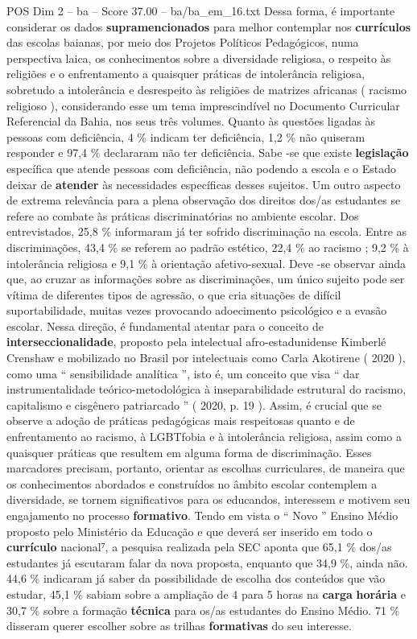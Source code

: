 \begin{textsample}{POS Dim 2 – ba – Score 37.00 – ba/ba\_em\_16.txt}
Dessa forma, é importante considerar os dados \textbf{supramencionados} para melhor contemplar nos \textbf{currículos} das escolas baianas, por meio dos Projetos Políticos Pedagógicos, numa perspectiva laica, os conhecimentos sobre a diversidade religiosa, o respeito às religiões e o enfrentamento a quaisquer práticas de intolerância religiosa, sobretudo a intolerância e desrespeito às religiões de matrizes africanas ( racismo religioso ), considerando esse um tema imprescindível no Documento Curricular Referencial da Bahia, nos seus três volumes.
Quanto às questões ligadas às pessoas com deficiência, 4 \% indicam ter deficiência, 1,2 \% não quiseram responder e 97,4 \% declararam não ter deficiência.
Sabe -se que existe \textbf{legislação} específica que atende pessoas com deficiência, não podendo a escola e o Estado deixar de \textbf{atender} às necessidades específicas desses sujeitos.
Um outro aspecto de extrema relevância para a plena observação dos direitos dos/as estudantes se refere ao combate às práticas discriminatórias no ambiente escolar.
Dos entrevistados, 25,8 \% informaram já ter sofrido discriminação na escola.
Entre as discriminações, 43,4 \% se referem ao padrão estético, 22,4 \% ao racismo ; 9,2 \% à intolerância religiosa e 9,1 \% à orientação afetivo-sexual.
Deve -se observar ainda que, ao cruzar as informações sobre as discriminações, um único sujeito pode ser vítima de diferentes tipos de agressão, o que cria situações de difícil suportabilidade, muitas vezes provocando adoecimento psicológico e a evasão escolar.
Nessa direção, é fundamental atentar para o conceito de \textbf{interseccionalidade}, proposto pela intelectual afro-estadunidense Kimberlé Crenshaw e mobilizado no Brasil por intelectuais como Carla Akotirene ( 2020 ), como uma “ sensibilidade analítica ”, isto é, um conceito que visa “ dar instrumentalidade teórico-metodológica à inseparabilidade estrutural do racismo, capitalismo e cisgênero patriarcado ” ( 2020, p. 19 ).
Assim, é crucial que se observe a adoção de práticas pedagógicas mais respeitosas quanto e de enfrentamento ao racismo, à LGBTfobia e à intolerância religiosa, assim como a quaisquer práticas que resultem em alguma forma de discriminação.
Esses marcadores precisam, portanto, orientar as escolhas curriculares, de maneira que os conhecimentos abordados e construídos no âmbito escolar contemplem a diversidade, se tornem significativos para os educandos, interessem e motivem seu engajamento no processo \textbf{formativo}.
Tendo em vista o “ Novo ” Ensino Médio proposto pelo Ministério da Educação e que deverá ser inserido em todo o \textbf{currículo} nacional⁷, a pesquisa realizada pela SEC aponta que 65,1 \% dos/as estudantes já escutaram falar da nova proposta, enquanto que 34,9 \%, ainda não. 44,6 \% indicaram já saber da possibilidade de escolha dos conteúdos que vão estudar, 45,1 \% sabiam sobre a ampliação de 4 para 5 horas na \textbf{carga} \textbf{horária} e 30,7 \% sobre a formação \textbf{técnica} para os/as estudantes do Ensino Médio. 71 \% disseram querer escolher sobre as trilhas \textbf{formativas} do seu interesse.

\end{textsample}
